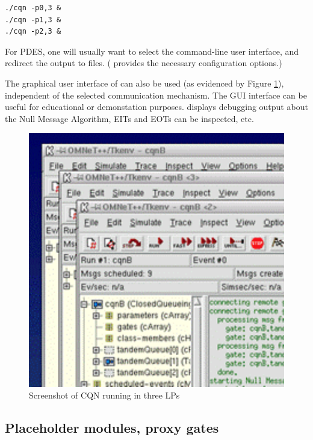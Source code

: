 \begin{verbatim}
./cqn -p0,3 &
./cqn -p1,3 &
./cqn -p2,3 &
\end{verbatim}

For PDES, one will usually want to select the command-line user interface,
and redirect the output to files. ({\opp} provides the necessary
configuration options.)

The graphical user interface of {\opp} can also be used
(as evidenced by Figure \ref{fig:parsim-screenshot}),
independent of the selected communication mechanism.
The GUI interface can be useful for educational or demonstation purposes.
{\opp} displays debugging output about the Null Message Algorithm,
EITs and EOTs can be inspected, etc.





\begin{figure}[htbp]
  \begin{center}
    \includegraphics{figures/parsim-screenshot}
    \caption{Screenshot of CQN running in three LPs}
    \label{fig:parsim-screenshot}
  \end{center}
\end{figure}



\subsection{Placeholder modules, proxy gates}

